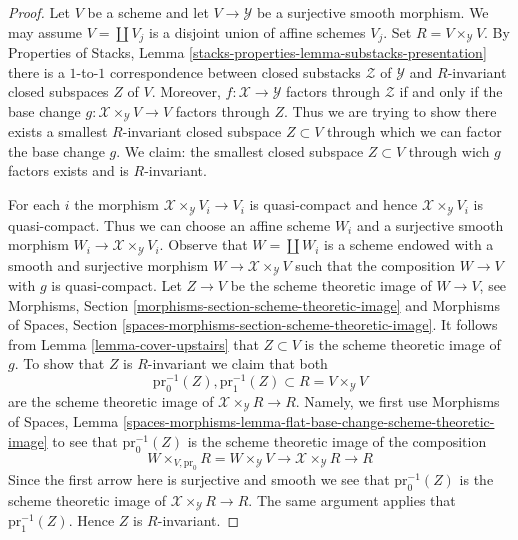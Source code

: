 \begin{proof}
Let $V$ be a scheme and let $V \to \mathcal{Y}$ be a
surjective smooth morphism. We may assume $V = \coprod V_j$ is a disjoint
union of affine schemes $V_j$.
Set $R = V \times_\mathcal{Y} V$.
By Properties of Stacks, Lemma
\ref{stacks-properties-lemma-substacks-presentation}
there is a $1$-to-$1$ correspondence between
closed substacks $\mathcal{Z}$ of $\mathcal{Y}$ and
$R$-invariant closed subspaces $Z$ of $V$.
Moreover, $f : \mathcal{X} \to \mathcal{Y}$ factors through $\mathcal{Z}$
if and only if the base change
$g : \mathcal{X} \times_\mathcal{Y} V \to V$ factors through $Z$.
Thus we are trying to show there exists a smallest $R$-invariant
closed subspace $Z \subset V$ through which we can factor the base change $g$.
We claim: the smallest closed subspace $Z \subset V$
through wich $g$ factors exists and is $R$-invariant.

\medskip\noindent
For each $i$ the morphism $\mathcal{X} \times_\mathcal{Y} V_i \to V_i$
is quasi-compact and hence $\mathcal{X} \times_\mathcal{Y} V_i$ is
quasi-compact. Thus we can choose an affine scheme $W_i$ and a
surjective smooth morphism $W_i \to \mathcal{X} \times_\mathcal{Y} V_i$.
Observe that $W = \coprod W_i$ is a scheme endowed with
a smooth and surjective morphism $W \to \mathcal{X} \times_\mathcal{Y} V$
such that the composition $W \to V$ with $g$ is quasi-compact.
Let $Z \to V$ be the scheme theoretic image of $W \to V$, see
Morphisms, Section
\ref{morphisms-section-scheme-theoretic-image} and
Morphisms of Spaces, Section
\ref{spaces-morphisms-section-scheme-theoretic-image}.
It follows from Lemma \ref{lemma-cover-upstairs}
that $Z \subset V$ is the scheme theoretic image of $g$.
To show that $Z$ is $R$-invariant we claim that both
$$
\text{pr}_0^{-1}(Z), \text{pr}_1^{-1}(Z) \subset R = V \times_\mathcal{Y} V
$$
are the scheme theoretic image of $\mathcal{X} \times_\mathcal{Y} R \to R$.
Namely, we first use Morphisms of Spaces, Lemma
\ref{spaces-morphisms-lemma-flat-base-change-scheme-theoretic-image}
to see that $\text{pr}_0^{-1}(Z)$ is the scheme theoretic image
of the composition
$$
W \times_{V, \text{pr}_0} R = W \times_\mathcal{Y} V \to
\mathcal{X} \times_\mathcal{Y} R \to R
$$
Since the first arrow here is surjective and smooth we see that
$\text{pr}_0^{-1}(Z)$ is the scheme theoretic image of
$\mathcal{X} \times_\mathcal{Y} R \to R$. The same argument applies
that $\text{pr}_1^{-1}(Z)$. Hence $Z$ is $R$-invariant.


\end{proof}
